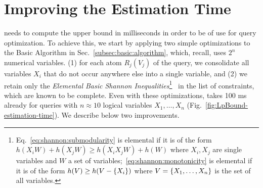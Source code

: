 \section{Improving the Estimation Time}
\label{sec:algorithm}

% 

\system needs to compute the upper bound in milliseconds in order to
be of use for query optimization.  To achieve this, we start by
applying two simple optimizations to the Basic Algorithm \lpbase in
Sec.~\ref{subsec:basic:algorithm}, which, recall, uses $2^n$ numerical
variables.  (1) for each atom $R_j(V_j)$ of the query, we consolidate
all variables $X_i$ that do not occur anywhere else into a single
variable, and (2) we retain only the \emph{Elemental Basic Shannon
  Inequalities}\footnote{Eq.~\eqref{eq:shannon:submodularity} is
  elemental if it is of the form $h(X_iW)+h(X_jW)\geq h(X_iX_jW)+h(W)$
  where $X_i,X_j$ are single variables and $W$ a set of
  variables;~\eqref{eq:shannon:monotonicity} is elemental if it is of
  the form $h(V)\geq h(V-\{X_i\})$ where $V=\{X_1, \ldots, X_n\}$
  is the set of all variables.}~\cite{Yeung:2008:ITN:1457455} in the
list of constraints, which are known to be complete.  Even with these
optimizations, \lpbase takes 100 ms already for queries with
$n \approx 10$ logical variables $X_1, \ldots, X_n$
(Fig.~\ref{fig:LpBound-estimation-time}).  We describe below two
improvements. 

